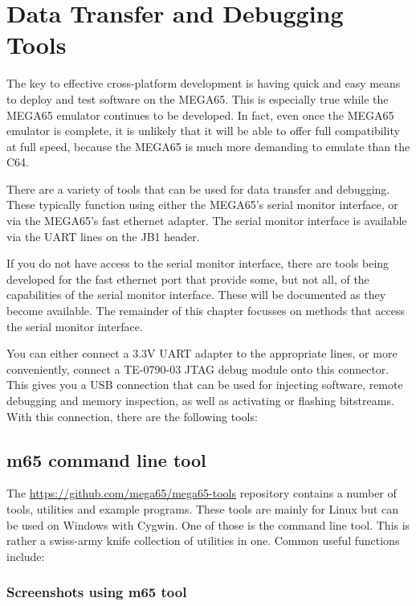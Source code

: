 \chapter{Data Transfer and Debugging Tools}
\label{cha:transfer-and-debug-tools}

The key to effective cross-platform development is having quick and
easy means to deploy and test software on the MEGA65.  This is
especially true while the MEGA65 emulator continues to be developed.
In fact, even once the MEGA65 emulator is complete, it is unlikely
that it will be able to offer full compatibility at full speed,
because the MEGA65 is much more demanding to emulate than the C64.

There are a variety of tools that can be used for data transfer and
debugging.  These typically function using either the MEGA65's serial
monitor interface, or via the MEGA65's fast ethernet adapter.  The
serial monitor interface is available via the UART lines on the JB1
header.

If you do not have access to the serial monitor interface, there are
tools being developed for the fast ethernet port that provide some,
but not all, of the capabilities of the serial monitor
interface. These will be documented as they become available. The
remainder of this chapter focusses on methods that access the serial
monitor interface.

You can either connect a 3.3V UART adapter to the appropriate
lines, or more conveniently, connect a TE-0790-03 JTAG debug module
onto this connector.  This gives you a USB connection that can be used
for injecting software, remote debugging and memory inspection, as
well as activating or flashing bitstreams.  With this connection,
there are the following tools:

\section{m65 command line tool}

The \url{https://github.com/mega65/mega65-tools} repository contains a
number of tools, utilities and example programs. These tools are mainly for Linux but can be used on Windows with Cygwin. One of those is
the  command line tool. This is rather a swiss-army
knife collection of utilities in one.  Common useful functions
include:

\subsection{Screenshots using m65 tool}

